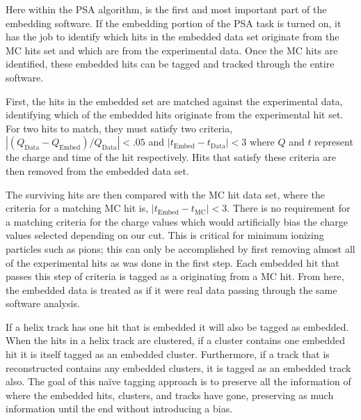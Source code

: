 Here within the PSA algorithm, is the first and most important part of the embedding software. If the embedding portion of the PSA task is turned on,  it has the job to identify which hits in the embedded data set originate from the MC hits set and which are from the experimental data. Once the MC hits are identified, these embedded hits can be tagged and tracked through the entire software. 

First, the hits in the embedded set are matched against the experimental data, identifying which of the embedded hits originate from the experimental hit set. For two hits to match, they must satisfy two criteria, $\left|(Q_{\mathrm{Data}} - Q_{\mathrm{Embed} })/Q_{\mathrm{Data}}\right| < .05$ and $\left|t_{\mathrm{Embed} } - t_{\mathrm{Data} }\right| < 3$ where $Q$ and $t$ represent the charge and time of the hit respectively. Hits that satisfy these criteria are then removed from the embedded data set.

The surviving hits are then compared with the MC hit data set, where the criteria for a matching MC hit is, $\left|t_{\mathrm{Embed} } - t_{\mathrm{MC} }\right| < 3$.  There is no requirement for a matching criteria for the charge values which would artificially bias the charge values selected depending on our cut. This is critical for minimum ionizing particles such as pions; this can only be accomplished by first removing almost all of the experimental hits as was done in the first step. Each embedded hit that passes this step of criteria is tagged as a originating from a MC hit. From here, the embedded data is treated as if it were real data passing through the same software analysis. 

 If a helix track has one hit that is embedded it will also be tagged as embedded. When the hits in a helix track are clustered, if a cluster contains one embedded hit it is itself tagged as an embedded cluster. Furthermore, if a track that is reconstructed contains any embedded clusters, it is tagged as an embedded track also. The goal of this na\"ive tagging approach is to preserve all the information of where the embedded hits, clusters, and tracks have gone, preserving as much information until the end without introducing a bias.
 
